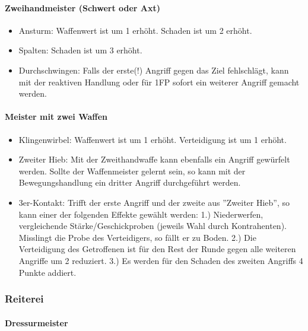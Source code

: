\documentclass{article}
\begin{document}
\paragraph{Zweihandmeister (Schwert oder Axt)}

\begin{itemize}
\item Ansturm: Waffenwert ist um 1 erhöht. Schaden ist um 2 erhöht.
\item Spalten: Schaden ist um 3 erhöht.
\item Durchschwingen: Falls der erste(!) Angriff gegen das Ziel fehlschlägt, kann mit der reaktiven Handlung oder für 1FP sofort ein weiterer Angriff gemacht werden.
\end{itemize}

\paragraph{Meister mit zwei Waffen}

\begin{itemize}
\item Klingenwirbel: Waffenwert ist um 1 erhöht. Verteidigung ist um 1 erhöht.
\item Zweiter Hieb: Mit der Zweithandwaffe kann ebenfalls ein Angriff gewürfelt werden. Sollte der Waffenmeister gelernt sein, so kann mit der Bewegungshandlung ein dritter Angriff durchgeführt werden.
\item 3er-Kontakt: Trifft der erste Angriff und der zweite aus ''Zweiter Hieb'', so kann einer der folgenden Effekte gewählt werden: 1.) Niederwerfen, vergleichende Stärke/Geschickproben (jeweils Wahl durch Kontrahenten). Misslingt die Probe des Verteidigers, so fällt er zu Boden. 2.) Die Verteidigung des Getroffenen ist für den Rest der Runde gegen alle weiteren Angriffe um 2 reduziert. 3.) Es werden für den Schaden des zweiten Angriffs 4 Punkte addiert.
\end{itemize}

\subsubsection{Reiterei}

\paragraph{Dressurmeister}
\end{document}
